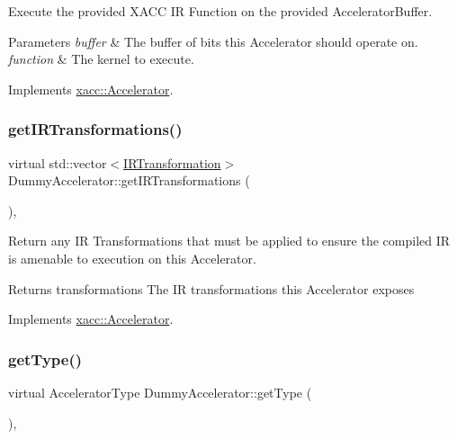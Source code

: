 Execute the provided X\+A\+CC IR Function on the provided Accelerator\+Buffer.


\begin{DoxyParams}{Parameters}
{\em buffer} & The buffer of bits this Accelerator should operate on. \\
\hline
{\em function} & The kernel to execute. \\
\hline
\end{DoxyParams}


Implements \hyperlink{a01435_a89b3f3e6294f228abf03a410b0fb1674}{xacc\+::\+Accelerator}.

\mbox{\label{a01143_aac0e2ae753064701468fa1188ac7549f}} 
\subsubsection{\texorpdfstring{get\+I\+R\+Transformations()}{getIRTransformations()}}
{\footnotesize\ttfamily virtual std\+::vector$<$\hyperlink{a01503}{I\+R\+Transformation}$>$ Dummy\+Accelerator\+::get\+I\+R\+Transformations (\begin{DoxyParamCaption}{ }\end{DoxyParamCaption})\hspace{0.3cm}{\ttfamily [inline]}, {\ttfamily [virtual]}}

Return any IR Transformations that must be applied to ensure the compiled IR is amenable to execution on this Accelerator.

\begin{DoxyReturn}{Returns}
transformations The IR transformations this Accelerator exposes 
\end{DoxyReturn}


Implements \hyperlink{a01435_ad6e4a642dcb24e552675bcbeff1e1b04}{xacc\+::\+Accelerator}.

\mbox{\label{a01143_acdfe3e856f2bacc9e0dc1a51782a52e3}} 
\subsubsection{\texorpdfstring{get\+Type()}{getType()}}
{\footnotesize\ttfamily virtual Accelerator\+Type Dummy\+Accelerator\+::get\+Type (\begin{DoxyParamCaption}{ }\end{DoxyParamCaption})\hspace{0.3cm}{\ttfamily [inline]}, {\ttfamily [virtual]}}

